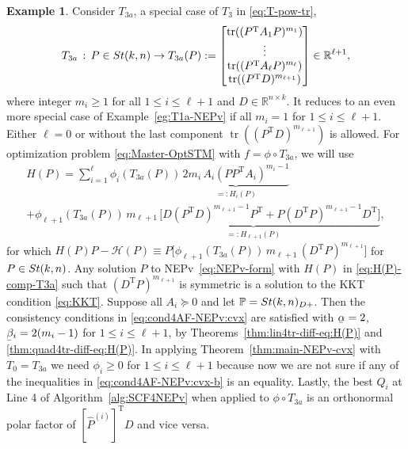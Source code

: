 \documentclass[11pt]{article}
\def\bbP{\mathbb{P}}
\def\bbR{\mathbb{R}}
\def\scrH{\mathscr{H}}
\def\what{\widehat}
\newcommand\munderbar[1]{%
  \underaccent{\bar}{#1}}
\newcommand\STM[2]{{\rm St}(#1,#2)}
\DeclareMathOperator{\tr}{tr}
\DeclareMathOperator{\T}{T}
\theoremstyle{definition}
\newtheorem{example}{Example}[section]
\numberwithin{equation}{section}
\begin{document}
\begin{example}\label{eg:T3a}
Consider $T_{3a}$, a special case of $T_3$ in \eqref{eq:T-pow-tr},
\begin{equation}\label{eq:T-pow-tr-a}
T_{3a}\,:\, P\in\STM{k}{n} \to T_{3a}(P):=\begin{bmatrix}\tr((P^{\T}A_1P)^{m_1}) \\
                                        \vdots \\
                                        \tr((P^{\T}A_{\ell}P)^{m_{\ell}}) \\
                                        \tr((P^{\T}D)^{m_{\ell+1}})
                                      \end{bmatrix} \in\bbR^{\ell+1},
\end{equation}
where integer $m_i\ge 1$ for all $1\le i\le\ell+1$  and $D\in\bbR^{n\times k}$. It reduces to an even more special case of Example~\ref{eg:T1a-NEPv}
if all $m_i=1$ for $1\le i\le\ell+1$.
Either $\ell=0$ or without the last component $\tr((P^{\T}D)^{m_{\ell+1}})$  is allowed.
For optimization problem \eqref{eq:Master-OptSTM} with
$f=\phi\circ T_{3a}$, we will use
\begin{multline}\label{eq:H(P)-comp-T3a}
H(P)=\sum_{i=1}^{\ell}\phi_i(T_{3a}(P))\,\underbrace{2m_i\,A_i(PP^{\T}A_i)^{m_i-1}}_{=:H_i(P)} \\
     +\phi_{\ell+1}(T_{3a}(P))\, \underbrace{m_{\ell+1}\,\big[D(P^{\T}D)^{m_{\ell+1}-1}P^{\T}+P(D^{\T}P)^{m_{\ell+1}-1}D^{\T}\big]}_{=:H_{\ell+1}(P)},
\end{multline}
for which $H(P)P-\scrH(P)\equiv P\big[\phi_{\ell+1}(T_{3a}(P))\,m_{\ell+1}\,(D^{\T}P)^{m_{\ell+1}}\big]$ for $P\in\STM{k}{n}$.
Any solution $P$ to NEPv~\eqref{eq:NEPv-form} with
$H(P)$ in \eqref{eq:H(P)-comp-T3a} such that $(D^{\T}P)^{m_{\ell+1}}$ is symmetric is a solution to the KKT condition \eqref{eq:KKT}.
Suppose all $A_i\succeq 0$ and let $\bbP=\STM{k}{n}_{D+}$.
Then
the consistency conditions in \eqref{eq:cond4AF-NEPv:cvx} are satisfied with
$\munderbar\alpha=2$, $\munderbar\beta_i=2(m_i-1)$ for $1\le i\le\ell+1$, by
Theorems~\ref{thm:lin4tr-diff-eq:H(P)} and \ref{thm:quad4tr-diff-eq:H(P)}.
In applying Theorem~\ref{thm:main-NEPv-cvx} with $T_0=T_{3a}$ we need $\phi_i\ge 0$ for $1\le i\le\ell+1$
because now we are not sure if any of the inequalities in \eqref{eq:cond4AF-NEPv:cvx-b} is an equality.
Lastly, the best $Q_i$ at Line 4 of Algorithm~\ref{alg:SCF4NEPv} when applied to
$\phi\circ T_{3a}$
is an orthonormal polar factor of $[\what P^{(i)}]^{\T}D$ and vice versa.
\end{example}
\end{document}
